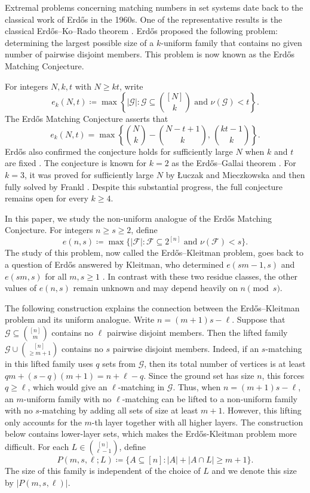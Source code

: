 \documentclass[10pt,a4paper]{article}
\numberwithin{equation}{section}
\theoremstyle{definition}
\newcommand{\F}{\mathcal F}
\newcommand{\G}{\mathcal G}
\begin{document}
Extremal problems concerning matching numbers in set systems date back to the classical work of Erd\H{o}s in the 1960s.
One of the representative results is the classical Erd\H{o}s--Ko--Rado theorem \cite{ErdosKoRado}.
Erd\H{o}s \cite{ErdosEMC} proposed the following problem: determining the largest possible size of a $k$-uniform family that contains no given number of
pairwise disjoint members.
This problem is now known as the Erd\H{o}s Matching Conjecture.

For integers $N,k,t$ with $N\ge kt$, write
\[
    e_k(N,t)
    \coloneqq
    \max\left\{|\G|:\G\subseteq\binom{[N]}k
    \text{ and } \nu(\G)<t\right\}.
\]
The Erd\H{o}s Matching Conjecture \cite{ErdosEMC} asserts that
\[
    e_k(N,t)
    =
    \max\left\{
    \binom Nk-\binom{N-t+1}k,\,
    \binom{kt-1}k
    \right\}.
\]
Erd\H{o}s also confirmed the conjecture holds for sufficiently large $N$ when $k$ and $t$ are fixed \cite{ErdosEMC}.
The conjecture is known for $k=2$ as the Erd\H{o}s--Gallai theorem
\cite{ErdosGallai}.
For $k=3$, it was proved for sufficiently large $N$ by \L{}uczak and Mieczkowska \cite{LuczakMieczkowska} and then fully solved by Frankl \cite{FranklDAM}.
Despite this substantial progress, the full conjecture remains open for every $k\ge4$.

In this paper, we study the non-uniform analogue of the Erd\H{o}s Matching Conjecture.
For integers $n\ge s\ge2$, define
\[
    e(n,s)
    \coloneqq
    \max\{|\F|:\F\subseteq2^{[n]}\text{ and }\nu(\F)<s\}.
\]
The study of this problem, now called the Erd\H{o}s--Kleitman problem, goes back to a question of Erd\H{o}s answered by Kleitman, who determined $e(sm-1,s)$ and $e(sm,s)$ for all $m,s\ge1$ \cite{Kleitman}.
In contrast with these two residue classes, the other values of $e(n,s)$ remain unknown and may depend heavily on $n\pmod s$.

The following construction explains the connection between the Erd\H{o}s--Kleitman problem and its uniform analogue.
Write $n=(m+1)s-\ell$.
Suppose that $\G\subseteq\binom{[n]}m$ contains no $\ell$ pairwise disjoint
members.
Then the lifted family $\G\cup\binom{[n]}{\ge m+1}$ contains no $s$ pairwise disjoint members.
Indeed, if an $s$-matching in this lifted family uses $q$ sets from $\G$, then its total number of vertices is at least $qm+(s-q)(m+1)=n+\ell-q$.
Since the ground set has size $n$, this forces $q\ge\ell$, which would give an $\ell$-matching in $\G$.
Thus, when $n=(m+1)s-\ell$, an $m$-uniform family with no $\ell$-matching can be lifted to a non-uniform family with no $s$-matching by adding all sets of size at least $m+1$.
However, this lifting only accounts for the $m$-th layer together with all higher layers.
The construction below contains lower-layer sets, which makes the Erd\H{o}s-Kleitman problem more difficult.
For each $L\in\binom{[n]}{\ell-1}$, define
\[
    P(m,s,\ell;L)
    \coloneqq
    \{A\subseteq[n]: |A|+|A\cap L|\ge m+1\}.
\]
The size of this family is independent of the choice of $L$ and we denote this
size by $|P(m,s,\ell)|$.
\end{document}

